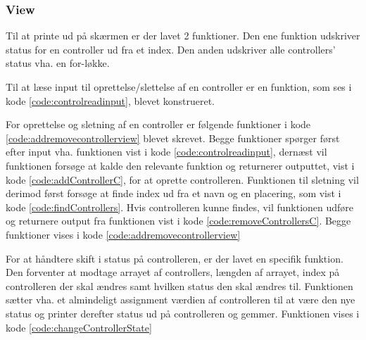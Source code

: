 

\subsubsection*{View}
Til at printe ud på skærmen er der lavet 2 funktioner. Den ene funktion udskriver status for en controller ud fra et index. Den anden udskriver alle controllers' status vha. en for-løkke.


Til at læse input til oprettelse/slettelse af en controller er en funktion, som ses i kode \ref{code:controlreadinput}, blevet konstrueret.


For oprettelse og sletning af en controller er følgende funktioner i kode \ref{code:addremovecontrollerview} blevet skrevet. Begge funktioner spørger først efter input vha. funktionen vist i kode \ref{code:controlreadinput}, dernæst vil funktionen forsøge at kalde den relevante funktion og returnerer outputtet, vist i kode \ref{code:addControllerC}, for at oprette controlleren. Funktionen til sletning vil derimod først forsøge at finde index ud fra et navn og en placering, som vist i kode \ref{code:findControllers}. Hvis controlleren kunne findes, vil funktionen udføre og returnere output fra funktionen vist i kode \ref{code:removeControllersC}. Begge funktioner vises i kode \ref{code:addremovecontrollerview}


For at håndtere skift i status på controlleren, er der lavet en specifik funktion. Den forventer at modtage arrayet af controllers, længden af arrayet, index på controlleren der skal ændres samt hvilken status den skal ændres til. Funktionen sætter vha. et almindeligt assignment værdien af controlleren til at være den nye status og printer derefter status ud på controlleren og gemmer. Funktionen vises i kode \ref{code:changeControllerState}



